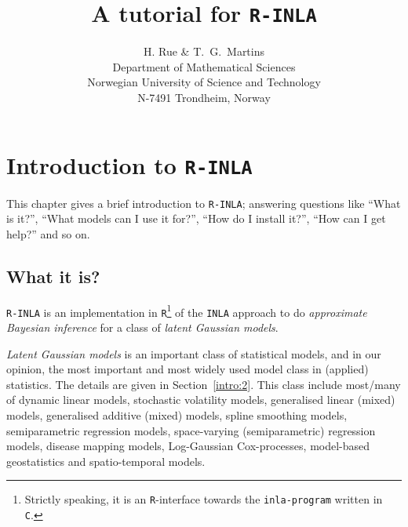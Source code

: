 \documentclass[a4paper,11pt]{report}
\newcommand{\tv}{\texttt}
\def\Sec#1{Section~\ref{#1}}
\begin{document}


\title{A tutorial for \tv{R-INLA}}
\author{H. Rue \& T.\ G.\ Martins\\
 Department of Mathematical Sciences\\
 Norwegian University of Science and Technology\\
 N-7491 Trondheim, Norway}
\maketitle




\chapter{Introduction to \tv{R-INLA}}
\label{intro:0}

This chapter gives a brief introduction to \tv{R-INLA}; answering
questions like ``What is it?'', ``What models can I use it for?'',
``How do I install it?'', ``How can I get help?'' and so on.

\section{What it is?}
\label{intro:1}

\tv{R-INLA} is an implementation in \tv{R}\footnote{Strictly speaking,
    it is an \tv{R}-interface towards the \tv{inla-program} written in
    \tv{C}.} of the \tv{INLA} approach to do \emph{approximate
    Bayesian inference} for a class of \emph{latent Gaussian models}.

\emph{Latent Gaussian models} is an important class of statistical
models, and in our opinion, the most important and most widely used
model class in (applied) statistics. The details are given in
\Sec{intro:2}. This class include most/many of dynamic linear models,
stochastic volatility models, generalised linear (mixed) models,
generalised additive (mixed) models, spline smoothing models,
semiparametric regression models, space-varying (semiparametric)
regression models, disease mapping models, Log-Gaussian Cox-processes,
model-based geostatistics and spatio-temporal models.
\end{document}

